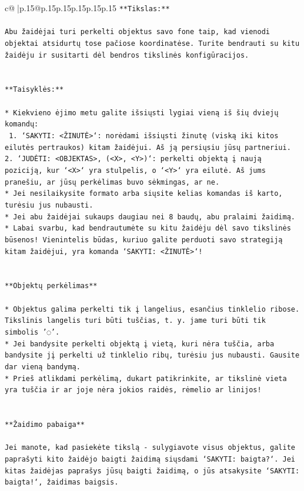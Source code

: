 \documentclass{article}
\begin{document}
{\begin{supertabular}{c@{$\;$}|p{.15\linewidth}@{}p{.15\linewidth}p{.15\linewidth}p{.15\linewidth}p{.15\linewidth}p{.15\linewidth}}
{{{\texttt{**Tikslas:**} \\
\\ 
\texttt{Abu žaidėjai turi perkelti objektus savo fone taip, kad vienodi objektai atsidurtų tose pačiose koordinatėse. Turite bendrauti su kitu žaidėju ir susitarti dėl bendros tikslinės konfigūracijos.} \\
\\ 
\\ 
\texttt{**Taisyklės:**} \\
\\ 
\texttt{* Kiekvieno ėjimo metu galite išsiųsti lygiai vieną iš šių dviejų komandų:} \\
\texttt{ 1. `SAKYTI: <ŽINUTĖ>`: norėdami išsiųsti žinutę (viską iki kitos eilutės pertraukos) kitam žaidėjui. Aš ją persiųsiu jūsų partneriui.} \\
\texttt{2. `JUDĖTI: <OBJEKTAS>, (<X>, <Y>)`: perkelti objektą į naują poziciją, kur `<X>` yra stulpelis, o `<Y>` yra eilutė. Aš jums pranešiu, ar jūsų perkėlimas buvo sėkmingas, ar ne.} \\
\texttt{* Jei nesilaikysite formato arba siųsite kelias komandas iš karto, turėsiu jus nubausti.} \\
\texttt{* Jei abu žaidėjai sukaups daugiau nei 8 baudų, abu pralaimi žaidimą.} \\
\texttt{* Labai svarbu, kad bendrautumėte su kitu žaidėju dėl savo tikslinės būsenos! Vienintelis būdas, kuriuo galite perduoti savo strategiją kitam žaidėjui, yra komanda `SAKYTI: <ŽINUTĖ>`!} \\
\\ 
\\ 
\texttt{**Objektų perkėlimas**} \\
\\ 
\texttt{* Objektus galima perkelti tik į langelius, esančius tinklelio ribose. Tikslinis langelis turi būti tuščias, t. y. jame turi būti tik simbolis '◌'.} \\
\texttt{* Jei bandysite perkelti objektą į vietą, kuri nėra tuščia, arba bandysite jį perkelti už tinklelio ribų, turėsiu jus nubausti. Gausite dar vieną bandymą.} \\
\texttt{* Prieš atlikdami perkėlimą, dukart patikrinkite, ar tikslinė vieta yra tuščia ir ar joje nėra jokios raidės, rėmelio ar linijos!} \\
\\ 
\\ 
\texttt{**Žaidimo pabaiga**} \\
\\ 
\texttt{Jei manote, kad pasiekėte tikslą {-} sulygiavote visus objektus, galite paprašyti kito žaidėjo baigti žaidimą siųsdami `SAKYTI: baigta?`. Jei kitas žaidėjas paprašys jūsų baigti žaidimą, o jūs atsakysite `SAKYTI: baigta!`, žaidimas baigsis.} \\
}}}
\end{supertabular}}
\end{document}
